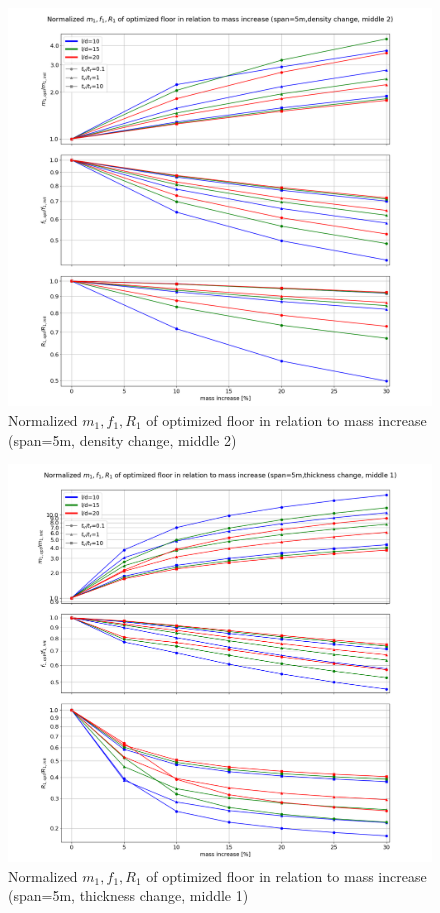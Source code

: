 \begin{figure}[H]
\centering
\includegraphics[width=.99\textwidth]{images/mass_inc_density_middle2.png}
\caption{Normalized $m_1,f_1,R_1$ of optimized floor in relation to mass increase (span=5m, density change, middle 2)}
\label{fig:mass_inc_density_middle2}
\end{figure}

\begin{figure}[H]
\centering
\includegraphics[width=.99\textwidth]{images/mass_inc_thickness_middle1.png}
\caption{Normalized $m_1,f_1,R_1$ of optimized floor in relation to mass increase (span=5m, thickness change, middle 1)}
\label{fig:mass_inc_thickness_middle1}
\end{figure}

